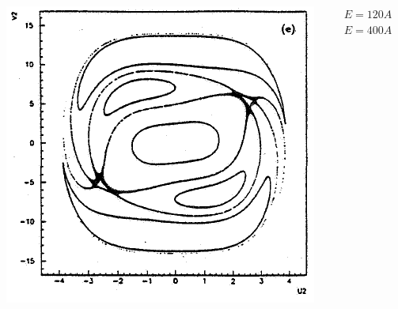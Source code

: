 \documentclass[a4,compress]{beamer}
\begin{document}
\begin{frame}
\begin{columns}[c]
\begin{column}{0.35\textwidth}
    \includegraphics[height=0.45\textheight]{ponicare-sections-e_400}
  \end{column}
  \begin{column}{0.15\textwidth}
    \small \(E = 120A\) \\
    \vspace{3cm}
    \(E = 400A\)
  \end{column}
  \end{columns}
\end{frame}

\end{document}
